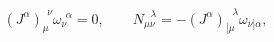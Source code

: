 \begin{equation}
\label{3.4}
(J^\alpha)_\mu^{\!~~\nu} \omega_\nu^{\!~~\alpha} = 0,
\qquad
N_{\mu\nu}^{~~~\lambda} = -
(J^\alpha)_{[\mu}^{\!~~~\lambda} \omega_{\nu] \alpha},
\end{equation}

